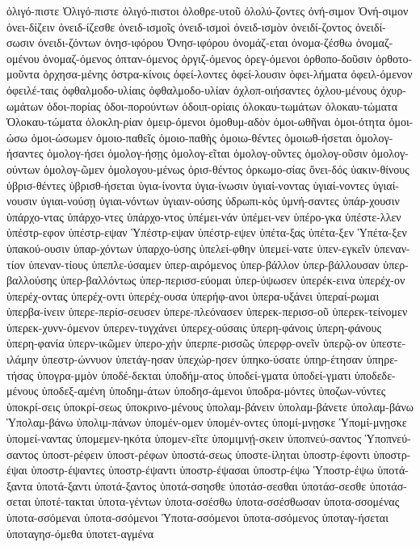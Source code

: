 {ὀλιγό-πιστε
Ὀλιγό-πιστε
ὀλιγό-πιστοι
ὀλοθρε-υτοῦ
ὀλολύ-ζοντες
ὀνή-σιμον
Ὀνή-σιμον
ὀνει-δίζειν
ὀνειδ-ίζεσθε
ὀνειδ-ισμοῖς
ὀνειδ-ισμοὶ
ὀνειδ-ισμὸν
ὀνειδί-ζοντος
ὀνειδί-σωσιν
ὀνειδι-ζόντων
ὀνησ-ιφόρου
Ὀνησ-ιφόρου
ὀνομάζ-εται
ὀνομα-ζέσθω
ὀνομαζ-ομένου
ὀνομαζ-όμενος
ὀπταν-όμενος
ὀργιζ-όμενος
ὀρεγ-όμενοι
ὀρθοπο-δοῦσιν
ὀρθοτο-μοῦντα
ὀρχησα-μένης
ὀστρα-κίνοις
ὀφεί-λοντες
ὀφεί-λουσιν
ὀφει-λήματα
ὀφειλ-όμενον
ὀφειλέ-ταις
ὀφθαλμοδο-υλίαις
ὀφθαλμοδο-υλίαν
ὀχλοπ-οιήσαντες
ὀχλου-μένους
ὀχυρ-ωμάτων
ὁδοι-πορίας
ὁδοι-πορούντων
ὁδοιπ-ορίαις
ὁλοκαυ-τωμάτων
ὁλοκαυ-τώματα
Ὁλοκαυ-τώματα
ὁλοκλη-ρίαν
ὁμειρ-όμενοι
ὁμοθυμ-αδὸν
ὁμοι-ωθῆναι
ὁμοι-ότητα
ὁμοι-ώσω
ὁμοι-ώσωμεν
ὁμοιο-παθεῖς
ὁμοιο-παθὴς
ὁμοιω-θέντες
ὁμοιωθ-ήσεται
ὁμολογ-ήσαντες
ὁμολογ-ήσει
ὁμολογ-ήσῃς
ὁμολογ-εῖται
ὁμολογ-οῦντες
ὁμολογ-οῦσιν
ὁμολογ-ούντων
ὁμολογ-ῶμεν
ὁμολογου-μένως
ὁρισ-θέντος
ὁρκωμο-σίας
ὄνει-δός
ὑακιν-θίνους
ὑβρισ-θέντες
ὑβρισθ-ήσεται
ὑγια-ίνοντα
ὑγια-ίνωσιν
ὑγιαί-νοντας
ὑγιαί-νοντες
ὑγιαί-νουσιν
ὑγιαι-νούσῃ
ὑγιαι-νόντων
ὑγιαιν-ούσης
ὑδρωπι-κὸς
ὑμνή-σαντες
ὑπάρ-χουσιν
ὑπάρχο-ντας
ὑπάρχο-ντες
ὑπάρχο-ντος
ὑπέμει-νάν
ὑπέμει-νεν
ὑπέρο-γκα
ὑπέστε-λλεν
ὑπέστρ-εφον
ὑπέστρ-εψαν
Ὑπέστρ-εψαν
ὑπέστρ-εψεν
ὑπέτα-ξας
ὑπέτα-ξεν
Ὑπέτα-ξεν
ὑπακού-ουσιν
ὑπαρ-χόντων
ὑπαρχο-ύσης
ὑπελεί-φθην
ὑπεμεί-νατε
ὑπεν-εγκεῖν
ὑπεναν-τίον
ὑπεναν-τίους
ὑπεπλε-ύσαμεν
ὑπερ-αιρόμενος
ὑπερ-βάλλον
ὑπερ-βάλλουσαν
ὑπερ-βαλλούσης
ὑπερ-βαλλόντως
ὑπερ-περισσ-εύομαι
ὑπερ-ύψωσεν
ὑπερέκ-εινα
ὑπερέχ-ον
ὑπερέχ-οντας
ὑπερέχ-οντι
ὑπερέχ-ουσα
ὑπερήφ-ανοι
ὑπερα-υξάνει
ὑπεραί-ρωμαι
ὑπερβα-ίνειν
ὑπερε-περίσ-σευσεν
ὑπερε-πλεόνασεν
ὑπερεκ-περισσ-οῦ
ὑπερεκ-τείνομεν
ὑπερεκ-χυνν-όμενον
ὑπερεν-τυγχάνει
ὑπερεχ-ούσαις
ὑπερη-φάνοις
ὑπερη-φάνους
ὑπερη-φανία
ὑπερν-ικῶμεν
ὑπερο-χὴν
ὑπερπε-ρισσῶς
ὑπερφρ-ονεῖν
ὑπερῷ-ον
ὑπεστε-ιλάμην
ὑπεστρ-ώννυον
ὑπετάγ-ησαν
ὑπεχώρ-ησεν
ὑπηκο-ύσατε
ὑπηρ-έτησαν
ὑπηρε-τήσας
ὑπογρα-μμὸν
ὑποδέ-δεκται
ὑποδήμ-ατος
ὑποδεί-γματα
ὑποδεί-γματι
ὑποδεδε-μένους
ὑποδεξ-αμένη
ὑποδημ-άτων
ὑποδησ-άμενοι
ὑποδρα-μόντες
ὑποζων-νύντες
ὑποκρί-σεις
ὑποκρί-σεως
ὑποκρινο-μένους
ὑπολαμ-βάνειν
ὑπολαμ-βάνετε
ὑπολαμ-βάνω
Ὑπολαμ-βάνω
ὑπολιμ-πάνων
ὑπομέν-ομεν
ὑπομέν-οντες
ὑπομί-μνῃσκε
Ὑπομί-μνῃσκε
ὑπομεί-ναντας
ὑπομεμεν-ηκότα
ὑπομεν-εῖτε
ὑπομιμνῄ-σκειν
ὑποπνεύ-σαντος
Ὑποπνεύ-σαντος
ὑποστ-ρέφειν
ὑποστ-ρέφων
ὑποστά-σεως
ὑποστε-ίληται
ὑποστρ-έφοντι
ὑποστρ-έψαι
ὑποστρ-έψαντες
ὑποστρ-έψαντι
ὑποστρ-έψασαι
ὑποστρ-έψω
Ὑποστρ-έψω
ὑποτά-ξαντα
ὑποτά-ξαντι
ὑποτά-ξαντος
ὑποτά-σσησθε
ὑποτάσ-σεσθαι
ὑποτάσ-σεσθε
ὑποτάσ-σεται
ὑποτέ-τακται
ὑποτα-γέντων
ὑποτα-σσέσθω
ὑποτα-σσέσθωσαν
ὑποτα-σσομένας
ὑποτα-σσόμεναι
ὑποτα-σσόμενοι
Ὑποτα-σσόμενοι
ὑποτα-σσόμενος
ὑποταγ-ήσεται
ὑποταγησ-όμεθα
ὑποτετ-αγμένα
}
